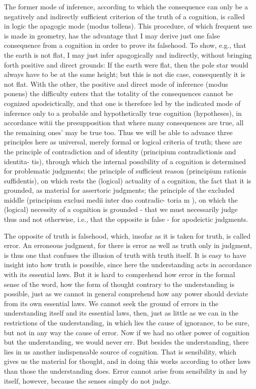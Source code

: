 The former mode of inference, according to which the consequence
can only be a negatively and indirectly sufficient criterion of the truth of a
cognition, is called in logic the apagogic mode (modus tollens).
This procedure, of which frequent use is made in geometry, has the
advantage that I may derive just one false consequence from a cognition in
order to prove its falsehood. To show, e.g., that the earth is not flat, I may
just infer apagogically and indirectly, without bringing forth positive and
direct grounds: If the earth were flat, then the pole star would always have
to be at the same height; but this is not die case, consequently it is not flat.
With the other, the positive and direct mode of inference (modus ponens)
the difficulty enters that the totality of the consequences cannot be
cognized apodeictically, and that one is therefore led by the indicated
mode of inference only to a probable and hypothetically true cognition
(hypotheses), in accordance witii the presupposition that where many
consequences are true, all the remaining ones' may be true too.
Thus we will be able to advance three principles here as universal,
merely formal or logical criteria of truth; these are
the principle of contradiction and of identity (principium contradictionis and identita-
tis), through which the internal possibility of a cognition is determined for
problematic judgments;
the principle of sufficient reason (principium rationis suffidentis), on which rests
the (logical) actuality of a cognition, the fact that it is grounded, as material for
assertoric judgments;
the principle of the excluded middle (principium exclusi medii inter duo contradic-
toria m ), on which the (logical) necessity of a cognition is grounded - that we
must necessarily judge thus and not otherwise, i.e., that the opposite is false -
for apodeictic judgments.

The opposite of truth is falsehood, which,
insofar as it is taken for truth, is called error.
An erroneous judgment, for there is error as well as truth only in judgment,
is thus one that confuses the illusion of truth with truth itself.
It is easy to have insight into how truth is possible,
since here the understanding acts in accordance with its essential laws.
But it is hard to comprehend how error in the formal sense of the word,
how the form of thought contrary to the understanding is possible,
just as we cannot in general comprehend how any power
should deviate from its own essential laws.
We cannot seek the ground of errors in
the understanding itself and its essential laws, then,
just as little as we can in the restrictions of the understanding,
in which lies the cause of ignorance, to be sure,
but not in any way the cause of error.
Now if we had no other power of cognition
but the understanding, we would never err.
But besides the understanding, there lies in us
another indispensable source of cognition.
That is sensibility, which gives us the material for thought, and
in doing this works according to other laws than those the understanding does.
Error cannot arise from sensibility in and by itself, however,
because the senses simply do not judge.

